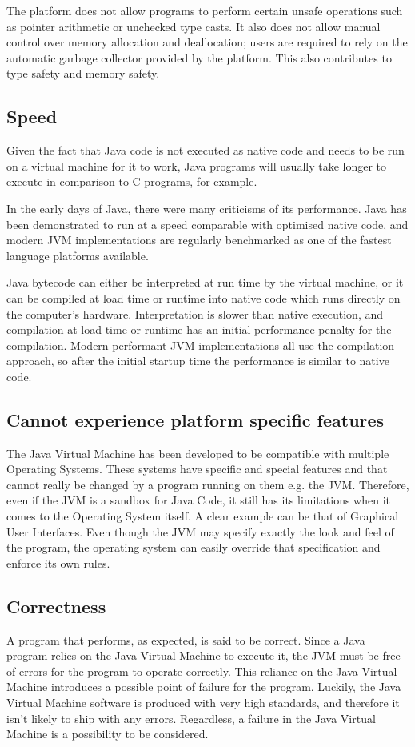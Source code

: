 \documentclass[english,runningheads,a4paper]{llncs}[2018/03/10]
\begin{document}
The platform does not allow programs to perform certain unsafe operations such
as pointer arithmetic or unchecked type casts. It also does not allow manual
control over memory allocation and deallocation; users are required to rely on
the automatic garbage collector provided by the platform. This also contributes
to type safety and memory safety.

\subsection*{Speed}
Given the fact that Java code is not executed as native code and needs to be run
on a virtual machine for it to work, Java programs will usually take longer to
execute in comparison to C programs, for example.

In the early days of Java, there were many criticisms of its performance. Java
has been demonstrated to run at a speed comparable with optimised native code,
and modern JVM implementations are regularly benchmarked as one of the fastest
language platforms available.

Java bytecode can either be interpreted at run time by the virtual machine, or
it can be compiled at load time or runtime into native code which runs directly
on the computer's hardware. Interpretation is slower than native execution, and
compilation at load time or runtime has an initial performance penalty for the
compilation. Modern performant JVM implementations all use the compilation
approach, so after the initial startup time the performance is similar to native
code.

\subsection*{Cannot experience platform specific features}
The Java Virtual Machine has been developed to be compatible with multiple
Operating Systems. These systems have specific and special features and that
cannot really be changed by a program running on them e.g. the JVM. Therefore,
even if the JVM is a sandbox for Java Code, it still has its limitations
when it comes to the Operating System itself. A clear example can be that of
Graphical User Interfaces. Even though the JVM may specify exactly the look and
feel of the program, the operating system can easily override that specification
and enforce its own rules.

\subsection*{Correctness}
A program that performs, as expected, is said to be correct. Since a Java
program relies on the Java Virtual Machine to execute it, the JVM must be free
of errors for the program to operate correctly. This reliance on the Java
Virtual Machine introduces a possible point of failure for the program. Luckily,
the Java Virtual Machine software is produced with very high standards, and
therefore it isn't likely to ship with any errors. Regardless, a failure in the
Java Virtual Machine is a possibility to be considered.
\end{document}
